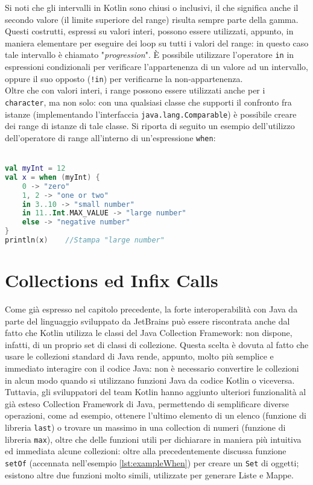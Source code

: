 Si noti che gli intervalli in Kotlin sono chiusi o inclusivi, il che significa anche il secondo valore (il limite superiore del range) risulta sempre parte della gamma. Questi costrutti, espressi su valori interi, possono essere utilizzati, appunto, in maniera elementare per eseguire dei loop su tutti i valori del range: in questo caso tale intervallo è chiamato "{\em progression}". È possibile utilizzare l'operatore \texttt{in} in espressioni condizionali per verificare l’appartenenza di un valore ad un intervallo, oppure il suo opposto (\texttt{!in}) per verificarne la non-appartenenza.\\
Oltre che con valori interi, i range possono essere utilizzati anche per i \texttt{character}, ma non solo: con una qualsiasi classe che supporti il confronto fra istanze (implementando l'interfaccia \texttt{java.lang.Comparable}) è possibile creare dei range di istanze di tale classe. Si riporta di seguito un esempio dell'utilizzo dell'operatore di range all'interno di un'espressione \texttt{when}:\\
\\

\begin{lstlisting}[caption={Operatore di range con valori interi all'interno di una espressione \texttt{when}}, captionpos=b, label={lst:exampleRangeWhen}, language=Kotlin]
val myInt = 12
val x = when (myInt) {
    0 -> "zero"
    1, 2 -> "one or two"
    in 3..10 -> "small number"
    in 11..Int.MAX_VALUE -> "large number"
    else -> "negative number"
}
println(x)    //Stampa "large number"
\end{lstlisting}

\section{Collections ed Infix Calls}
Come già espresso nel capitolo precedente, la forte interoperabilità con Java da parte del linguaggio sviluppato da JetBrains può essere riscontrata anche dal fatto che Kotlin utilizza le classi del Java Collection Framework: non dispone, infatti, di un proprio set di classi di collezione. Questa scelta è dovuta al fatto che usare le collezioni standard di Java rende, appunto, molto più semplice e immediato interagire con il codice Java: non è necessario convertire le collezioni in alcun modo quando si utilizzano funzioni Java da codice Kotlin o viceversa. Tuttavia, gli sviluppatori del team Kotlin hanno aggiunto ulteriori funzionalità al già esteso Collection Framework di Java, permettendo di semplificare diverse operazioni, come ad esempio, ottenere l'ultimo elemento di un elenco (funzione di libreria \texttt{last}) o trovare un massimo in una collection di numeri (funzione di libreria \texttt{max}), oltre che delle funzioni utili per dichiarare in maniera più intuitiva ed immediata alcune collezioni: oltre alla precedentemente discussa funzione \texttt{setOf} (accennata nell'esempio \ref{lst:exampleWhen}) per creare un \texttt{Set} di oggetti; esistono altre due funzioni molto simili, utilizzate per generare Liste e Mappe.\\

